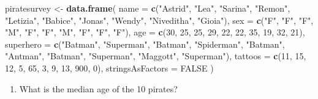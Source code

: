 \documentclass[]{book}
\newenvironment{Shaded}{\begin{snugshade}}{\end{snugshade}}
\newcommand{\KeywordTok}[1]{\textcolor[rgb]{0.13,0.29,0.53}{\textbf{{#1}}}}
\newcommand{\DataTypeTok}[1]{\textcolor[rgb]{0.13,0.29,0.53}{{#1}}}
\newcommand{\DecValTok}[1]{\textcolor[rgb]{0.00,0.00,0.81}{{#1}}}
\newcommand{\StringTok}[1]{\textcolor[rgb]{0.31,0.60,0.02}{{#1}}}
\newcommand{\OtherTok}[1]{\textcolor[rgb]{0.56,0.35,0.01}{{#1}}}
\newcommand{\NormalTok}[1]{{#1}}
\providecommand{\tightlist}{%
  \setlength{\itemsep}{0pt}\setlength{\parskip}{0pt}}
\theoremstyle{definition}
\theoremstyle{definition}
\theoremstyle{remark}
\begin{document}
\begin{Shaded}
\begin{Highlighting}[]
\NormalTok{piratesurvey <-}\StringTok{ }\KeywordTok{data.frame}\NormalTok{(}
  \DataTypeTok{name =} \KeywordTok{c}\NormalTok{(}\StringTok{"Astrid"}\NormalTok{, }\StringTok{"Lea"}\NormalTok{, }\StringTok{"Sarina"}\NormalTok{, }\StringTok{"Remon"}\NormalTok{, }\StringTok{"Letizia"}\NormalTok{, }\StringTok{"Babice"}\NormalTok{, }\StringTok{"Jonas"}\NormalTok{, }\StringTok{"Wendy"}\NormalTok{, }\StringTok{"Niveditha"}\NormalTok{, }\StringTok{"Gioia"}\NormalTok{),}
  \DataTypeTok{sex =} \KeywordTok{c}\NormalTok{(}\StringTok{"F"}\NormalTok{, }\StringTok{"F"}\NormalTok{, }\StringTok{"F"}\NormalTok{, }\StringTok{"M"}\NormalTok{, }\StringTok{"F"}\NormalTok{, }\StringTok{"F"}\NormalTok{, }\StringTok{"M"}\NormalTok{, }\StringTok{"F"}\NormalTok{, }\StringTok{"F"}\NormalTok{, }\StringTok{"F"}\NormalTok{),}
  \DataTypeTok{age =} \KeywordTok{c}\NormalTok{(}\DecValTok{30}\NormalTok{, }\DecValTok{25}\NormalTok{, }\DecValTok{25}\NormalTok{, }\DecValTok{29}\NormalTok{, }\DecValTok{22}\NormalTok{, }\DecValTok{22}\NormalTok{, }\DecValTok{35}\NormalTok{, }\DecValTok{19}\NormalTok{, }\DecValTok{32}\NormalTok{, }\DecValTok{21}\NormalTok{),}
  \DataTypeTok{superhero =} \KeywordTok{c}\NormalTok{(}\StringTok{"Batman"}\NormalTok{, }\StringTok{"Superman"}\NormalTok{, }\StringTok{"Batman"}\NormalTok{, }\StringTok{"Spiderman"}\NormalTok{, }\StringTok{"Batman"}\NormalTok{,}
               \StringTok{"Antman"}\NormalTok{, }\StringTok{"Batman"}\NormalTok{, }\StringTok{"Superman"}\NormalTok{, }\StringTok{"Maggott"}\NormalTok{, }\StringTok{"Superman"}\NormalTok{),}
  \DataTypeTok{tattoos =} \KeywordTok{c}\NormalTok{(}\DecValTok{11}\NormalTok{, }\DecValTok{15}\NormalTok{, }\DecValTok{12}\NormalTok{, }\DecValTok{5}\NormalTok{, }\DecValTok{65}\NormalTok{, }\DecValTok{3}\NormalTok{, }\DecValTok{9}\NormalTok{, }\DecValTok{13}\NormalTok{, }\DecValTok{900}\NormalTok{, }\DecValTok{0}\NormalTok{),}
  \DataTypeTok{stringsAsFactors =} \OtherTok{FALSE}
\NormalTok{)}
\end{Highlighting}
\end{Shaded}

\begin{enumerate}
\def\labelenumi{\arabic{enumi}.}
\setcounter{enumi}{1}
\tightlist
\item
  What is the median age of the 10 pirates?
\end{enumerate}

\begin{Shaded}
\end{Shaded}
\end{document}
